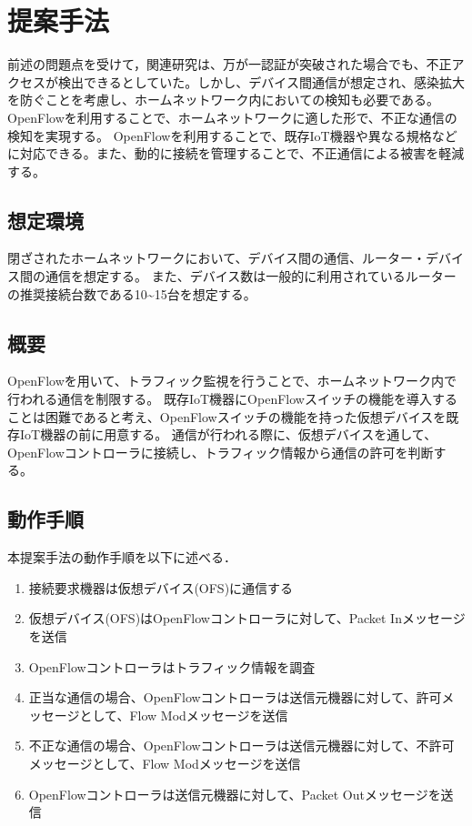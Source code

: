 \documentclass[a4paper,10pt,twocolumn,uplatex]{jsarticle}
\begin{document}
\section{提案手法}
前述の問題点を受けて，関連研究は、万が一認証が突破された場合でも、不正アクセスが検出できるとしていた。しかし、デバイス間通信が想定され、感染拡大を防ぐことを考慮し、ホームネットワーク内においての検知も必要である。
OpenFlowを利用することで、ホームネットワークに適した形で、不正な通信の検知を実現する。
OpenFlowを利用することで、既存IoT機器や異なる規格などに対応できる。また、動的に接続を管理することで、不正通信による被害を軽減する。

\subsection{想定環境}
閉ざされたホームネットワークにおいて、デバイス間の通信、ルーター・デバイス間の通信を想定する。
また、デバイス数は一般的に利用されているルーターの推奨接続台数である10\textasciitilde15台を想定する。

\subsection{概要}
OpenFlowを用いて、トラフィック監視を行うことで、ホームネットワーク内で行われる通信を制限する。
既存IoT機器にOpenFlowスイッチの機能を導入することは困難であると考え、OpenFlowスイッチの機能を持った仮想デバイスを既存IoT機器の前に用意する。
通信が行われる際に、仮想デバイスを通して、OpenFlowコントローラに接続し、トラフィック情報から通信の許可を判断する。

\subsection{動作手順}
本提案手法の動作手順を以下に述べる．

\begin{enumerate}
  \item 接続要求機器は仮想デバイス(OFS)に通信する
  \item 仮想デバイス(OFS)はOpenFlowコントローラに対して、Packet Inメッセージを送信
  \item OpenFlowコントローラはトラフィック情報を調査
  \item 正当な通信の場合、OpenFlowコントローラは送信元機器に対して、許可メッセージとして、Flow Modメッセージを送信
  \item 不正な通信の場合、OpenFlowコントローラは送信元機器に対して、不許可メッセージとして、Flow Modメッセージを送信
  \item OpenFlowコントローラは送信元機器に対して、Packet Outメッセージを送信
\end{enumerate}
\end{document}
